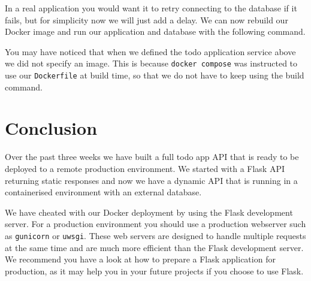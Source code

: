 \documentclass{csse4400}
\begin{document}
In a real application you would want it to retry connecting to the database if it fails,
but for simplicity now we will just add a delay.
We can now rebuild our Docker image and run our application and database with the following command.


You may have noticed that when we defined the todo application service above we did not specify an image.
This is because \texttt{docker compose} was instructed to use our \texttt{Dockerfile} at build time,
so that we do not have to keep using the build command.








\section{Conclusion}

Over the past three weeks we have built a full todo app API
that is ready to be deployed to a remote production environment.
We started with a Flask API returning static responses and
now we have a dynamic API that is running in a containerised environment with an external database.

We have cheated with our Docker deployment by using the Flask development server.
For a production environment you should use a production webserver such as \texttt{gunicorn} or \texttt{uwsgi}.
These web servers are designed to handle multiple requests at the same time and
are much more efficient than the Flask development server.
We recommend you have a look at how to prepare a Flask application for production,
as it may help you in your future projects if you choose to use Flask.




\end{document}
